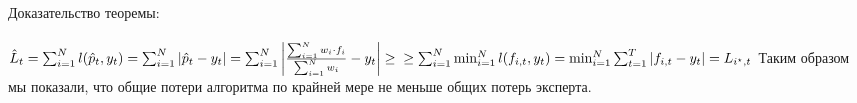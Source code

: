 \documentclass{article}
\begin{document}
Доказательство теоремы: \\\\
$
\hat{L}_t = \sum_{i=1}^N l(\hat{p}_t, y_t) = \sum_{i=1}^N |\hat{p}_t - y_t| = \sum_{i=1}^N \left|\frac{\sum_{i=1}^N w_i\cdot f_i}{\sum_{i=1}^N w_i} - y_t\right| \geq \\
\geq \sum_{i=1}^N \min_{i=1}^N l(f_{i,t},y_t) = \min_{i=1}^N \sum_{t=1}^T \left|f_{i,t} - y_t\right| = L_{i^\star,t} \\\\
$
Таким образом мы показали, что общие потери алгоритма по крайней мере не меньше общих потерь эксперта.
\end{document}
